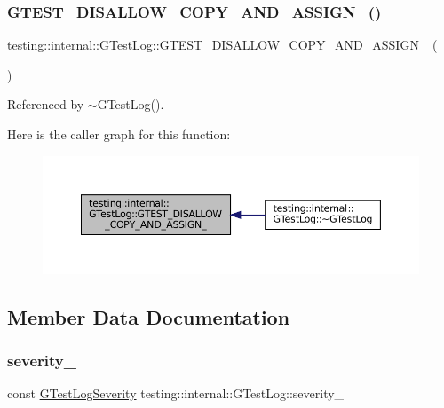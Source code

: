 \subsubsection{\texorpdfstring{G\+T\+E\+S\+T\+\_\+\+D\+I\+S\+A\+L\+L\+O\+W\+\_\+\+C\+O\+P\+Y\+\_\+\+A\+N\+D\+\_\+\+A\+S\+S\+I\+G\+N\+\_\+()}{GTEST\_DISALLOW\_COPY\_AND\_ASSIGN\_()}}
{\footnotesize\ttfamily testing\+::internal\+::\+G\+Test\+Log\+::\+G\+T\+E\+S\+T\+\_\+\+D\+I\+S\+A\+L\+L\+O\+W\+\_\+\+C\+O\+P\+Y\+\_\+\+A\+N\+D\+\_\+\+A\+S\+S\+I\+G\+N\+\_\+ (\begin{DoxyParamCaption}\item[{\hyperlink{classtesting_1_1internal_1_1GTestLog}{G\+Test\+Log}}]{ }\end{DoxyParamCaption})\hspace{0.3cm}{\ttfamily [private]}}



Referenced by $\sim$\+G\+Test\+Log().

Here is the caller graph for this function\+:
\nopagebreak
\begin{figure}[H]
\begin{center}
\leavevmode
\includegraphics[width=350pt]{classtesting_1_1internal_1_1GTestLog_ab6032a126d36a80163fdcd406fce3aad_icgraph}
\end{center}
\end{figure}


\subsection{Member Data Documentation}
\mbox{\label{classtesting_1_1internal_1_1GTestLog_ad8f75f5845900d0d2fd3cbb048a861be}} 
\subsubsection{\texorpdfstring{severity\+\_\+}{severity\_}}
{\footnotesize\ttfamily const \hyperlink{namespacetesting_1_1internal_aa6255ef3b023c5b4e1a2198d887fb977}{G\+Test\+Log\+Severity} testing\+::internal\+::\+G\+Test\+Log\+::severity\+\_\+\hspace{0.3cm}{\ttfamily [private]}}



